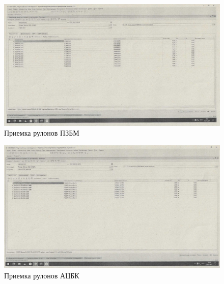 \begin{figure}
\begin{center}
 \includegraphics[height=0.38\textheight, keepaspectratio]{Pics/IX.1.....jpg}
\end{center}
 \caption{Приемка рулонов ПЗБМ}
 \label{pic:IX.1....}
\end{figure}

\begin{figure}
\begin{center}
 \includegraphics[height=0.38\textheight, keepaspectratio]{Pics/IX.1,.jpg}
\end{center}
 \caption{Приемка рулонов АЦБК}
 \label{pic:IX.1,}
\end{figure}

